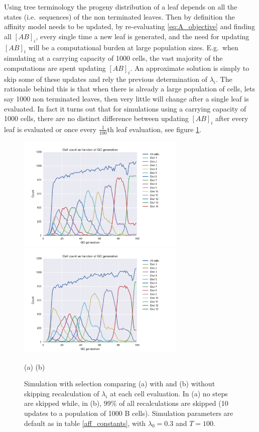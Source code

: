 Using tree terminology the progeny distribution of a leaf depends on all the states (i.e.\ sequences) of the non terminated leaves.
Then by definition the affinity model needs to be updated, by re-evaluating \eqref{eq:A_objective} and finding all $[AB]_i$, every single time a new leaf is generated, and the need for updating $[AB]_i$ will be a computational burden at large population sizes.
E.g.\ when simulating at a carrying capacity of 1000 cells, the vast majority of the computations are spent updating $[AB]_i$.
An approximate solution is simply to skip some of these updates and rely the previous determination of $\lambda_i$.
The rationale behind this is that when there is already a large population of cells, lets say 1000 non terminated leaves, then very little will change after a single leaf is evaluated.
In fact it turns out that for simulations using a carrying capacity of 1000 cells, there are no distinct difference between updating $[AB]_i$ after every leaf is evaluated or once every $\frac{1}{100}$th leaf evaluation, see figure \ref{fig:skip_vs_no_skip_dist10}.
\begin{figure}[!ht]
\begin{center}
\includegraphics[width=80mm]{figures/sim_selection_default_run_dist10.pdf}
\hspace{-22mm}
\includegraphics[width=80mm]{figures/sim_selection_default_run_dist10_no_skip.pdf} \newline%
\end{center}
\vspace{-9mm} \hspace{34mm} (a) \hspace{53mm} (b)
    \caption{
        \label{fig:skip_vs_no_skip_dist10}
        Simulation with selection comparing (a) with and (b) without skipping recalculation of $\lambda_i$ at each cell evaluation. In (a) no steps are skipped while, in (b), 99\% of all recalculations are skipped (10 updates to a population of 1000 B cells). Simulation parameters are default as in table \ref{aff_constants}, with $\lambda_0 = 0.3$ and $T=100$.
        }
\end{figure}

